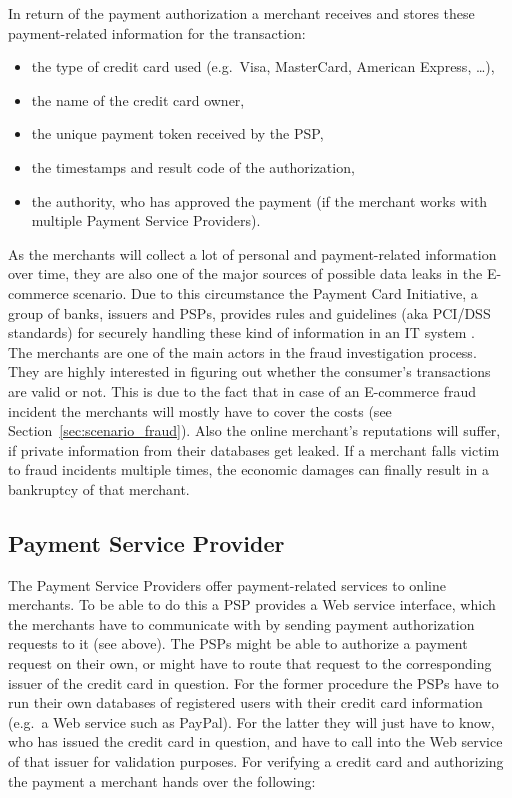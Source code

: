 In return of the payment authorization a merchant receives and stores these  payment-related information for the transaction:\@

\begin{itemize}
		\item the type of credit card used (e.g.\ Visa, MasterCard, American Express, \ldots),
		\item the name of the credit card owner,
		\item the unique payment token received by the \gls{PSP},
		\item the timestamps and result code of the authorization,
		\item the authority, who has approved the payment (if the merchant works with multiple Payment Service Providers).
\end{itemize}

As the merchants will collect a lot of personal and payment-related information over time, they are also one of the major sources of possible data leaks in the \gls{E-commerce} scenario. Due to this circumstance the Payment Card Initiative, a group of banks, issuers and \gls{PSP}s, provides rules and guidelines (aka \gls{PCI/DSS} standards) for securely handling these kind of information in an \gls{IT} system \citep{virtue2009payment}. \\

The merchants are one of the main actors in the fraud investigation process. They are highly interested in figuring out whether the consumer's transactions are valid or not. This is due to the fact that in case of an \gls{E-commerce} fraud incident the merchants will mostly have to cover the costs (see Section~\ref{sec:scenario_fraud}). Also the online merchant's reputations will suffer, if private information from their databases get leaked. If a merchant falls victim to fraud incidents multiple times, the economic damages can finally result in a bankruptcy of that merchant.


\subsection{Payment Service Provider}
\label{subsec:stakeholder_psp}

The Payment Service Providers offer payment-related services to online merchants. To be able to do this a \gls{PSP} provides a Web service interface, which the merchants have to communicate with by sending payment authorization requests to it (see above). The \gls{PSP}s might be able to authorize a payment request on their own, or might have to route that request to the corresponding issuer of the credit card in question. For the former procedure the \gls{PSP}s have to run their own databases of registered users with their credit card information (e.g.\ a Web service such as PayPal). For the latter they will just have to know, who has issued the credit card in question, and have to call into the Web service of that issuer for validation purposes. For verifying a credit card and authorizing the payment a merchant hands over the following:\@

